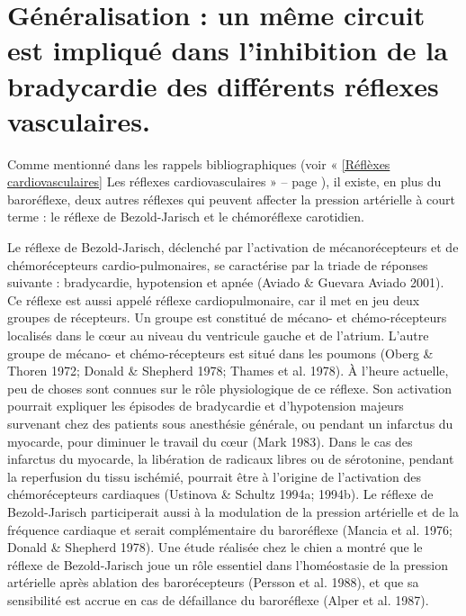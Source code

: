 \documentclass[a4paper,12pt,twoside]{report}
\begin{document}
\section{Généralisation : un même circuit est impliqué dans l’inhibition de la bradycardie des différents réflexes vasculaires.}

Comme mentionné dans les rappels bibliographiques (voir « \ref{Réflèxes cardiovasculaires} Les réflexes cardiovasculaires » – page \pageref{Réflèxes cardiovasculaires}), il existe, en plus du baroréflexe, deux autres réflexes qui peuvent affecter la pression artérielle à court terme : le réflexe de Bezold-Jarisch et le chémoréflexe carotidien. 

Le réflexe de Bezold-Jarisch, déclenché par l’activation de mécanorécepteurs et de chémorécepteurs cardio-pulmonaires, se caractérise par la triade de réponses suivante : bradycardie, hypotension et apnée (Aviado \& Guevara Aviado 2001). Ce réflexe est aussi appelé réflexe cardiopulmonaire, car il met en jeu deux groupes de récepteurs. Un groupe est constitué de mécano- et chémo-récepteurs localisés dans le cœur au niveau du ventricule gauche et de l’atrium. L’autre groupe de mécano- et chémo-récepteurs est situé dans les poumons (Oberg \& Thoren 1972; Donald \& Shepherd 1978; Thames et al. 1978). À l’heure actuelle, peu de choses sont connues sur le rôle physiologique de ce réflexe. Son activation pourrait expliquer les épisodes de bradycardie et d’hypotension majeurs survenant chez des patients sous anesthésie générale, ou pendant un infarctus du myocarde, pour diminuer le travail du cœur (Mark 1983). Dans le cas des infarctus du myocarde, la libération de radicaux libres ou de sérotonine, pendant la reperfusion du tissu ischémié, pourrait être à l’origine de l’activation des chémorécepteurs cardiaques (Ustinova \& Schultz 1994a; 1994b). Le réflexe de Bezold-Jarisch participerait aussi à la modulation de la pression artérielle et de la fréquence cardiaque et serait complémentaire du baroréflexe (Mancia et al. 1976; Donald \& Shepherd 1978). Une étude réalisée chez le chien a montré que le réflexe de Bezold-Jarisch joue un rôle essentiel dans l’homéostasie de la pression artérielle après ablation des barorécepteurs (Persson et al. 1988), et que sa sensibilité est accrue en cas de défaillance du baroréflexe (Alper et al. 1987).
\end{document}
